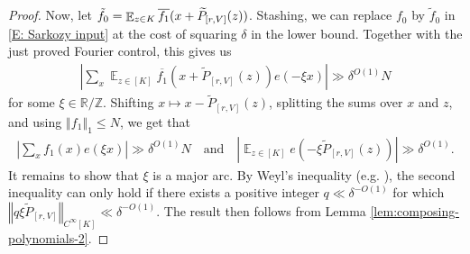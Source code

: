 \documentclass[11pt]{amsart}
\theoremstyle{definition}
\DeclareMathOperator*{\E}{\mathbb{E}}
\newcommand{\R}{{\mathbb R}}
\newcommand{\Z}{{\mathbb Z}}
\newcommand{\norm}[1]{\left\Vert #1\right\Vert}
\newcommand{\abs}[1]{\mathopen{}\left| #1\mathclose{}\right|}
\begin{document}
\begin{proof}
    Now, let $\Tilde{f}_0 = \E_{z\in{K}}\overline{f_1}(x+\widetilde{P}_{[r, V]}(z))$. Stashing, we can replace $f_0$ by $\tilde{f}_0$ in \eqref{E: Sarkozy input} at the cost of squaring $\delta$ in the lower bound. Together with the just proved Fourier control, this gives us 
    \begin{align*}
        \abs{\sum_{x}\E_{z\in[K]}\overline{f_1}(x+\widetilde{P}_{[r, V]}(z)) e(-\xi x)}\gg \delta^{O(1)}N
    \end{align*}
    for some $\xi\in\R/\Z$. Shifting $x\mapsto x-\widetilde{P}_{[r, V]}(z)$, splitting the sums over $x$ and $z$, and using $\norm{f_1}_1\leq N$, we get that
    \begin{align*}
        \abs{\sum_x f_1(x) e(\xi x)}\gg \delta^{O(1)}N\quad \textrm{and}\quad \abs{\E_{z\in[K]}e(-\xi \widetilde{P}_{[r, V]}(z))}\gg \delta^{O(1)}.
    \end{align*}
    It remains to show that $\xi$ is a major arc. By Weyl's inequality (e.g. \cite[Lemma 4.4]{GT12}), the second inequality can only hold if there exists a positive integer $q\ll \delta^{-O(1)}$ for which $\norm{q\xi \widetilde{P}_{[r, V]}}_{C^\infty[K]}\ll \delta^{-O(1)}$. The result then follows from Lemma \ref{lem:composing-polynomials-2}.
\end{proof}
\end{document}

